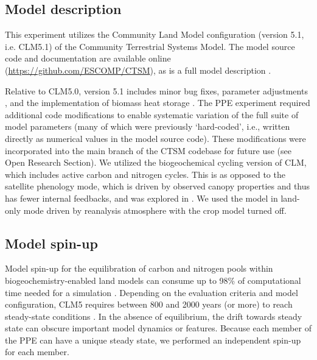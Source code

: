\documentclass[draft]{agujournal2019}
\begin{document}
\subsection{Model description}
\label{sect:md}
This experiment utilizes the Community Land Model configuration (version 5.1, i.e. CLM5.1) of the Community Terrestrial Systems Model. The model source code and documentation are available online (\url{https://github.com/ESCOMP/CTSM}), as is a full model description \cite{lawrence2019}.

Relative to CLM5.0, version 5.1 includes minor bug fixes, parameter adjustments \cite{birch2021}, and the implementation of biomass heat storage \cite{swenson2019}. The PPE experiment required additional code modifications to enable systematic variation of the full suite of model parameters (many of which were previously `hard-coded', i.e., written directly as numerical values in the model source code). These modifications were incorporated into the main branch of the CTSM codebase for future use (see Open Research Section). We utilized the biogeochemical cycling version of CLM, which includes active carbon and nitrogen cycles. This is as opposed to the satellite phenology mode, which is driven by observed canopy properties and thus has fewer internal feedbacks, and was explored in . We used the model in land-only mode driven by reanalysis atmosphere with the crop model turned off.

\subsection{Model spin-up}
\label{sect:mcn}
Model spin-up for the equilibration of carbon and nitrogen pools within biogeochemistry-enabled land models can consume up to 98\% of computational time needed for a simulation \cite{sun2023}. Depending on the evaluation criteria and model configuration, CLM5 requires between 800 and 2000 years (or more) to reach steady-state conditions \cite{lawrence2019}. In the absence of equilibrium, the drift towards steady state can obscure important model dynamics or features. Because each member of the PPE can have a unique steady state, we performed an independent spin-up for each member.
\end{document}
